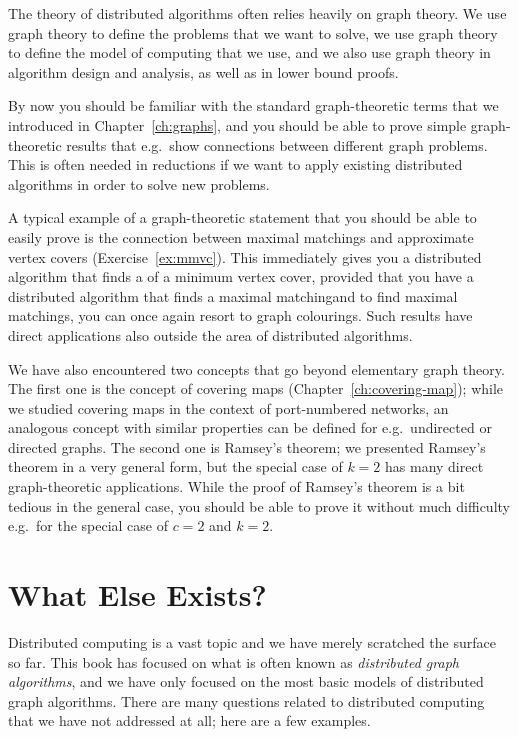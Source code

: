 The theory of distributed algorithms often relies heavily on graph theory. We use graph theory to define the problems that we want to solve, we use graph theory to define the model of computing that we use, and we also use graph theory in algorithm design and analysis, as well as in lower bound proofs.

By now you should be familiar with the standard graph-theoretic terms that we introduced in Chapter~\ref{ch:graphs}, and you should be able to prove simple graph-theoretic results that e.g.\ show connections between different graph problems. This is often needed in reductions if we want to apply existing distributed algorithms in order to solve new problems.

A typical example of a graph-theoretic statement that you should be able to easily prove is the connection between maximal matchings and approximate vertex covers (Exercise~\ref{ex:mmvc}). This immediately gives you a distributed algorithm that finds a  of a minimum vertex cover, provided that you have a distributed algorithm that finds a maximal matching\mydash and to find maximal matchings, you can once again resort to graph colourings. Such results have direct applications also outside the area of distributed algorithms.

We have also encountered two concepts that go beyond elementary graph theory. The first one is the concept of covering maps (Chapter~\ref{ch:covering-map}); while we studied covering maps in the context of port-numbered networks, an analogous concept with similar properties can be defined for e.g.\ undirected or directed graphs. The second one is Ramsey's theorem; we presented Ramsey's theorem in a very general form, but the special case of $k = 2$ has many direct graph-theoretic applications. While the proof of Ramsey's theorem is a bit tedious in the general case, you should be able to prove it without much difficulty e.g.\ for the special case of $c = 2$ and $k = 2$.


\section{What Else Exists?}

Distributed computing is a vast topic and we have merely scratched the surface so far. This book has focused on what is often known as \emph{distributed graph algorithms}, and we have only focused on the most basic models of distributed graph algorithms. There are many questions related to distributed computing that we have not addressed at all; here are a few examples.



